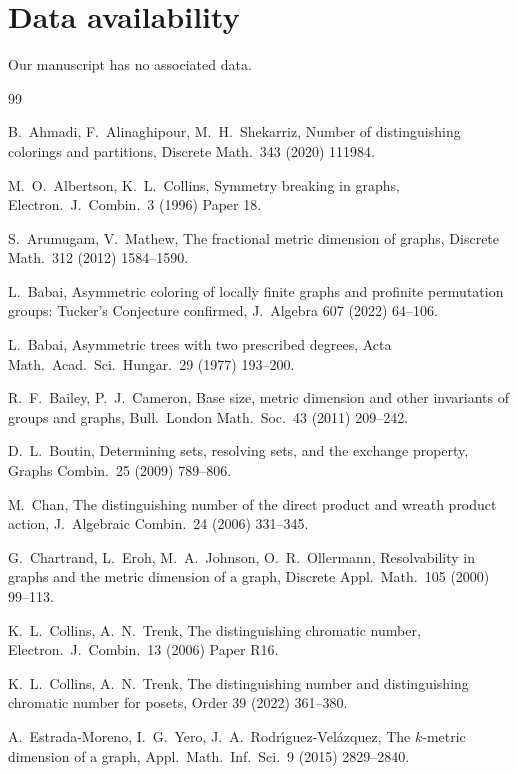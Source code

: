 \documentclass[12pt]{article}
\begin{document}
\section*{Data availability}

Our manuscript has no associated data.

\begin{thebibliography}{99}  

B.~Ahmadi, F.~Alinaghipour, M.~H.~Shekarriz,
Number of distinguishing colorings and partitions, 
Discrete Math.\ 343 (2020) 111984. 

M.~O.~Albertson, K.~L.~Collins,
Symmetry breaking in graphs, 
Electron.\ J.\ Combin.\ 3 (1996) Paper 18. 

S.~Arumugam, V.~Mathew, 
The fractional metric dimension of graphs, 
Discrete Math.\ 312 (2012) 1584--1590. 

L.~Babai, Asymmetric coloring of locally finite graphs and profinite permutation groups: Tucker’s Conjecture confirmed, 
J.\ Algebra 607 (2022) 64--106.

L.~Babai, Asymmetric trees with two prescribed degrees, 
Acta Math.\ Acad.\ Sci.\ Hungar.\  29 (1977) 193--200.

R.~F.~Bailey, P.~J.~Cameron,
Base size, metric dimension and other invariants of groups and graphs, 
Bull.\ London Math.\ Soc.\ 43 (2011) 209--242. 

D.~L.~Boutin, 
Determining sets, resolving sets, and the exchange property,
Graphs Combin.\ 25 (2009) 789--806.

M.~Chan,
The distinguishing number of the direct product and wreath product action, 
J.\ Algebraic Combin.\ 24 (2006) 331--345.

G.~Chartrand, L.~Eroh, M.~A.~Johnson, O.~R.~Ollermann, 
Resolvability in graphs and the metric dimension of a graph, 
Discrete Appl.\ Math.\ 105 (2000) 99--113.   

K.~L.~Collins, A.~N.~Trenk, 
The distinguishing chromatic number, 
Electron.\ J.\ Combin.\ 13 (2006) Paper R16. 

K.~L.~Collins, A.~N.~Trenk, 
The distinguishing number and distinguishing chromatic number for posets, 
Order 39 (2022) 361--380.

A.~Estrada-Moreno, I.~G.~Yero, J.~A.~Rodr\'{ı}guez-Vel\'{a}zquez,
The $k$-metric dimension of a graph, 
Appl.\ Math.\ Inf.\ Sci.\ 9 (2015) 2829--2840.    


\end{thebibliography}
\end{document}

